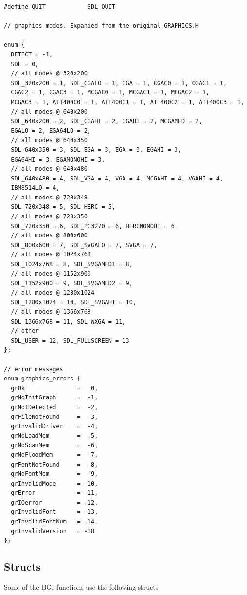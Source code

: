 \documentclass[a4paper,12pt]{article}
\begin{document}
\begin{small}
\begin{spacing}{0.85}
\begin{verbatim}
#define QUIT            SDL_QUIT

// graphics modes. Expanded from the original GRAPHICS.H

enum {
  DETECT = -1,
  SDL = 0,
  // all modes @ 320x200
  SDL_320x200 = 1, SDL_CGALO = 1, CGA = 1, CGAC0 = 1, CGAC1 = 1,
  CGAC2 = 1, CGAC3 = 1, MCGAC0 = 1, MCGAC1 = 1, MCGAC2 = 1,
  MCGAC3 = 1, ATT400C0 = 1, ATT400C1 = 1, ATT400C2 = 1, ATT400C3 = 1,
  // all modes @ 640x200
  SDL_640x200 = 2, SDL_CGAHI = 2, CGAHI = 2, MCGAMED = 2,
  EGALO = 2, EGA64LO = 2,
  // all modes @ 640x350
  SDL_640x350 = 3, SDL_EGA = 3, EGA = 3, EGAHI = 3,
  EGA64HI = 3, EGAMONOHI = 3,
  // all modes @ 640x480
  SDL_640x480 = 4, SDL_VGA = 4, VGA = 4, MCGAHI = 4, VGAHI = 4,
  IBM8514LO = 4,
  // all modes @ 720x348
  SDL_720x348 = 5, SDL_HERC = 5,
  // all modes @ 720x350
  SDL_720x350 = 6, SDL_PC3270 = 6, HERCMONOHI = 6,
  // all modes @ 800x600
  SDL_800x600 = 7, SDL_SVGALO = 7, SVGA = 7,
  // all modes @ 1024x768
  SDL_1024x768 = 8, SDL_SVGAMED1 = 8,
  // all modes @ 1152x900
  SDL_1152x900 = 9, SDL_SVGAMED2 = 9,
  // all modes @ 1280x1024
  SDL_1280x1024 = 10, SDL_SVGAHI = 10,
  // all modes @ 1366x768
  SDL_1366x768 = 11, SDL_WXGA = 11,
  // other
  SDL_USER = 12, SDL_FULLSCREEN = 13
};

// error messages
enum graphics_errors {
  grOk               =   0,
  grNoInitGraph      =  -1,
  grNotDetected      =  -2,
  grFileNotFound     =  -3,
  grInvalidDriver    =  -4,
  grNoLoadMem        =  -5,
  grNoScanMem        =  -6,
  grNoFloodMem       =  -7,
  grFontNotFound     =  -8,
  grNoFontMem        =  -9,
  grInvalidMode      = -10,
  grError            = -11,
  grIOerror          = -12,
  grInvalidFont      = -13,
  grInvalidFontNum   = -14,
  grInvalidVersion   = -18
};
\end{verbatim}
\end{spacing}
\end{small}

\subsection{Structs}

Some of the BGI functions use the following structs:
\end{document}
